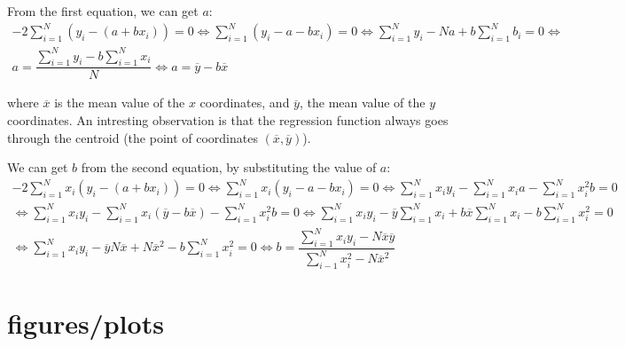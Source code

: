 \documentclass[notitlepage, 11pt]{report}
\begin{document}
		From the first equation, we can get $a$:
		\begin{multline*}
			-2\sum_{i=1}^{N}(y_i - (a+bx_i)) = 0 \Leftrightarrow \sum_{i=1}^{N}(y_i -a - bx_i) = 0 \Leftrightarrow \sum_{i=1}^{N}y_i - Na + b \sum_{i=1}^{N}b_i = 0 \Leftrightarrow \\
			 a = \dfrac{\sum_{i=1}^{N}y_i - b \sum_{i=1}^{N}x_i }{N} \Leftrightarrow a = \overline{y} - b \overline{x} 
		\end{multline*}
		
		where $\overline{x}$ is the mean value of the $x$ coordinates, and $\overline{y}$, the mean value of the $y$ coordinates. An intresting observation is that the regression function always goes through the centroid (the point of coordinates $(\overline{x}, \overline{y})$).
		
		We can get $b$ from the second equation, by substituting the value of $a$:		
		\begin{multline*}
			-2\sum_{i=1}^{N} x_i(y_i - (a+bx_i)) = 0 \Leftrightarrow 		\sum_{i=1}^{N}x_i(y_i -a - bx_i) = 0 \Leftrightarrow \sum_{i=1}^{N}x_iy_i - \sum_{i=1}^{N} x_ia - \sum_{i=1}^{N} x_i^2b = 0 \\
			\Leftrightarrow \sum_{i=1}^{N} x_iy_i - \sum_{i=1}^{N}x_i(\overline{y} - b\overline{x}) - \sum_{i=1}^{N} x_i^2b = 0 \Leftrightarrow \sum_{i=1}^{N}x_iy_i - \overline{y}\sum_{i=1}^{N}x_i + b\overline{x}\sum_{i=1}^{N}x_i - b\sum_{i=1}^{N} x_i^2 = 0 \\
			\Leftrightarrow \sum_{i=1}^{N} x_iy_i - \overline{y}N\overline{x} + N\overline{x}^2 - b\sum_{i=1}^{N}x_i^2 = 0 \Leftrightarrow b = \dfrac{\sum_{i=1}^{N}x_iy_i - N \overline{x}\overline{y}}{\sum_{i-1}^{N}x_i^2 - N\overline{x}^2}
 		\end{multline*}
 		
 		
			
					
		\section{figures/plots}
		
\end{document}
